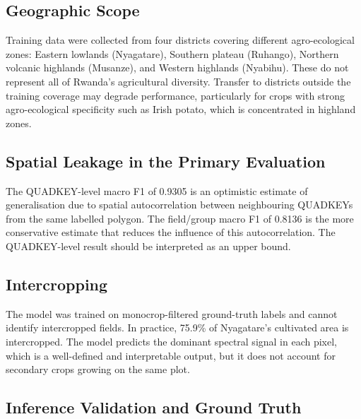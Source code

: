 \subsection*{Geographic Scope}

Training data were collected from four districts covering
different agro-ecological zones: Eastern lowlands (Nyagatare),
Southern plateau (Ruhango), Northern volcanic highlands (Musanze),
and Western highlands (Nyabihu). These do not represent all of
Rwanda's agricultural diversity. Transfer to districts outside
the training coverage may degrade performance, particularly for
crops with strong agro-ecological specificity such as Irish
potato, which is concentrated in highland zones.


\subsection*{Spatial Leakage in the Primary Evaluation}

The QUADKEY-level macro F1 of 0.9305 is an optimistic estimate
of generalisation due to spatial autocorrelation between
neighbouring QUADKEYs from the same labelled polygon. The
field/group macro F1 of 0.8136 is the more conservative estimate
that reduces the influence of this autocorrelation. The
QUADKEY-level result should be interpreted as an upper bound.


\subsection*{Intercropping}

The model was trained on monocrop-filtered ground-truth labels
and cannot identify intercropped fields. In practice, 75.9\%
of Nyagatare's cultivated area is intercropped. The model
predicts the dominant spectral signal in each pixel, which is
a well-defined and interpretable output, but it does not account
for secondary crops growing on the same plot.


\subsection*{Inference Validation and Ground Truth}

